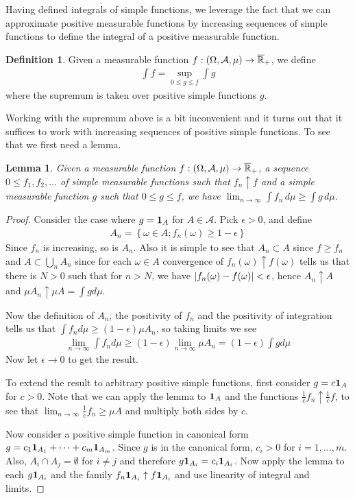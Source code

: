 \documentclass{amsart}
\newtheorem{lem}[thm]{Lemma}
\theoremstyle{remark}
\theoremstyle{definition}
\newtheorem{defn}[thm]{Definition}
\begin{document}
Having defined integrals of simple functions, we leverage the fact
that we can approximate positive measurable functions by increasing
sequences of simple functions to define the integral of a positive
measurable function.
\begin{defn}Given a measurable function $f : (\Omega, \mathcal{A},
  \mu) \to \overline{\mathbb{R}}_+$, we define 
\begin{align*}\int f = \sup_{0 \leq g \leq f} \int g
\end{align*}
where the supremum is taken over positive simple functions $g$.
\end{defn}
Working with the supremum above is a bit inconvenient and it turns out
that it suffices to work with increasing sequences of positive simple
functions.  To see that we first need a lemma.
\begin{lem}Given a measurable function $f : (\Omega,
  \mathcal{A}, \mu) \to \overline{\mathbb{R}}_+$, a sequence $0 \leq f_1, f_2, \dots$ of simple measurable
  functions such that $f_n \uparrow f$ and a simple measurable
  function $g$ such that $0 \leq g \leq f$, we have $\lim_{n \to \infty} \int f_n
  \, d\mu
  \geq \int g \, d\mu$.
\end{lem}
\begin{proof}Consider the case where $g = \textbf{1}_{A}$ for $A
  \in \mathcal{A}$.  Pick $\epsilon > 0$, and define
\begin{align*}
A_n = \left \{ \omega \in A; f_n(\omega) \geq 1 - \epsilon \right \}
\end{align*}
Since $f_n$ is increasing, so is $A_n$.  Also it is simple to see that
$A_n \subset A$ since $f \geq f_n$ and $A \subset \bigcup_n A_n$ since
for each $\omega \in A$ convergence of $f_n(\omega) \uparrow
f(\omega)$ tells us that there is $N > 0$ such that for $n > N$, we
have $\left \vert f_n(\omega) - f(\omega) \right \vert < \epsilon$, hence $A_n \uparrow
A$ and 
$\mu A_n \uparrow \mu A = \int g d \mu$.

Now the definition of $A_n$, the positivity of $f_n$ and the
positivity of integration tells us that
$\int f_n d \mu \geq (1 - \epsilon) \mu A_n$, so taking limits we see
\begin{align*}
\lim_{n \to \infty} \int f_n d \mu \geq (1 - \epsilon) \lim_{n \to
  \infty} \mu A_n = (1-\epsilon) \int g d \mu
\end{align*}
Now let $\epsilon \to 0$ to get the result.

To extend the result to arbitrary positive simple functions,  first consider $g
= c \textbf{1}_{A}$ for $c > 0$.  Note that we can apply the
lemma to $\textbf{1}_{A}$ and the functions $\frac{1}{c}f_n
\uparrow \frac{1}{c}f$, to see that $\lim_{n \to \infty}
\frac{1}{c}f_n \geq \mu A$ and multiply both sides by $c$.

Now consider a positive simple function in canonical form $g = c_1
\textbf{1}_{A_1} + \cdots + c_m \textbf{1}_{A_m}$.  Since $g$
is in the canonical form, $c_i > 0$ for $i=1, \dots, m$.  Also, $A_i \cap A_j = \emptyset$ for $i \neq j$
and therefore $g \textbf{1}_{A_i}  = c_i \textbf{1}_{A_i}$.
Now apply the lemma to each $g \textbf{1}_{A_i} $ and the family
$f_n \textbf{1}_{A_i}  \uparrow f \textbf{1}_{A_i} $ and use
linearity of integral and limits.
\end{proof}
\end{document}
